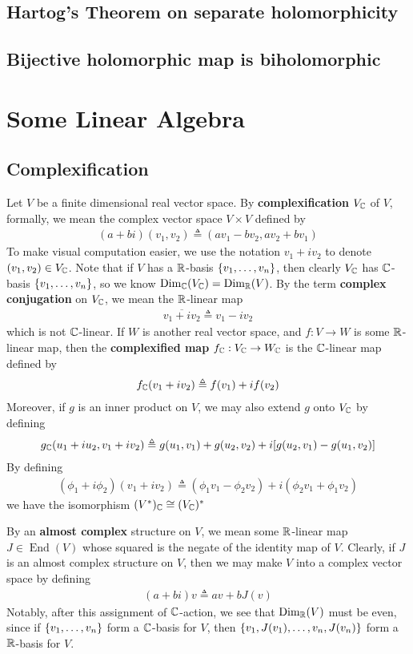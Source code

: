 \documentclass{report}
\begin{document}
\section{Hartog's Theorem on separate holomorphicity}
\section{Bijective holomorphic map is biholomorphic}
\chapter{Some Linear Algebra}
\section{Complexification}
Let $V$ be a finite dimensional real vector space. By \textbf{complexification} $V_{\mathbb{C}}$ of  $V$, formally, we mean the complex vector space $V\times V$ defined by 
\begin{align*}
  (a+b i)(v_1,v_2)\triangleq (av_1-bv_2, av_2+bv_1)
\end{align*}
To make visual computation easier, we use the notation $v_1+iv_2$  to denote $(v_1,v_2)\in V_{\mathbb{C}}$. Note that if $V$ has a $\mathbb{R}$-basis  $\{ v_1,\dots ,v_n \}$, then clearly $V_{\mathbb{C}}$ has  $\mathbb{C}$-basis  $\{ v_1,\dots ,v_n \}$, so we know $\operatorname{Dim}_{\mathbb{C}} (V_{\mathbb{C}})=\operatorname{Dim}_{\mathbb{R}} (V)$. By the term \textbf{complex conjugation} on $V_{\mathbb{C}}$, we mean the $\mathbb{R}$-linear map 
\begin{align*}
\overline{v_1+ iv_2}\triangleq v_1-iv_2
\end{align*}
which is not $\mathbb{C}$-linear. If $W$ is another real vector space, and  $f:V\rightarrow W$ is some $\mathbb{R}$-linear map, then the  \textbf{complexified map} $f_{\mathbb{C}}:V_{\mathbb{C}} \rightarrow W_{\mathbb{C}}$ is the $\mathbb{C}$-linear map defined by 
\begin{align*}
f_{\mathbb{C}}(v_1+iv_2)\triangleq f(v_1)+ if(v_2)
\end{align*}
Moreover, if $g$ is an inner product on $V$, we may also extend  $g$ onto $V_{\mathbb{C}}$ by defining 
 \begin{align*}
g_{\mathbb{C}} (u_1+iu_2, v_1+iv_2)\triangleq g(u_1,v_1)+g(u_2,v_2)+i [g(u_2,v_1)-g(u_1,v_2)]
\end{align*}
By defining 
\begin{align*}
  (\phi_1+ i\phi_2) (v_1+iv_2)\triangleq (\phi_1v_1-\phi_2v_2)+ i (\phi_2 v_1 + \phi_1 v_2)
\end{align*}
we have the isomorphism $(V^*)_{\mathbb{C}} \cong  (V_{\mathbb{C}})^*$


 By an \textbf{almost complex} structure on $V$, we mean some $\mathbb{R}$-linear map $J\in \operatorname{End}(V)$ whose squared is the negate of the identity map of $V$. Clearly, if $J$ is an almost complex structure on $V$, then we may make $V$ into a complex vector space by defining 
\begin{align*}
  (a+b i)v\triangleq av+bJ(v) 
\end{align*}
Notably, after this assignment of $\mathbb{C}$-action, we see that $\operatorname{Dim}_{\mathbb{R}}(V)$ must be even, since if $\{ v_1,\dots ,v_n \}$ form a $\mathbb{C}$-basis for  $V$, then  $\{ v_1,J(v_1),\dots ,v_n,J(v_n) \}$ form a $\mathbb{R}$-basis for  $V$. 
\end{document}

